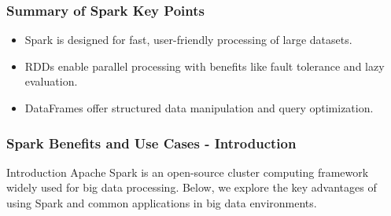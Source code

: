 \documentclass[aspectratio=169]{beamer}
\begin{document}
\begin{frame}[fragile]
    \frametitle{Summary of Spark Key Points}
    \begin{itemize}
        \item Spark is designed for fast, user-friendly processing of large datasets.
        \item RDDs enable parallel processing with benefits like fault tolerance and lazy evaluation.
        \item DataFrames offer structured data manipulation and query optimization.
    \end{itemize}
\end{frame}

\begin{frame}[fragile]
    \frametitle{Spark Benefits and Use Cases - Introduction}
    \begin{block}{Introduction}
        Apache Spark is an open-source cluster computing framework widely used for big data processing. Below, we explore the key advantages of using Spark and common applications in big data environments.
    \end{block}
\end{frame}
\end{document}
